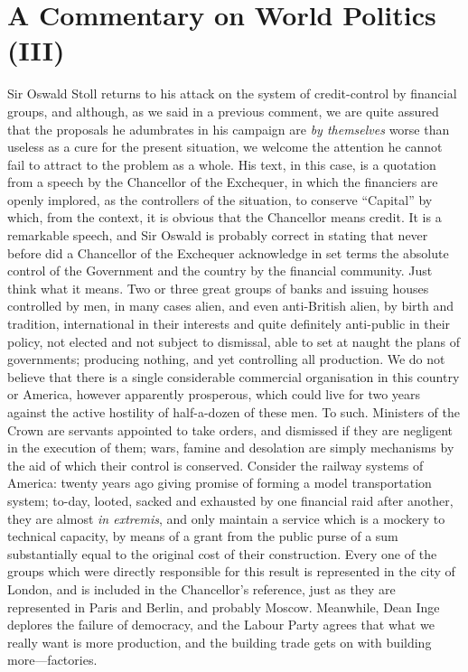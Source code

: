 \documentclass{book}
\begin{document}
\chapter{A Commentary on World Politics (III)}
\label{chapter-11}
Sir Oswald Stoll returns to his attack on the system of credit-control by financial groups, and although, as we said in a previous comment, we are quite assured that the proposals he adumbrates in his campaign are \emph{by themselves} worse than useless as a cure for the present situation, we welcome the attention he cannot fail to attract to the problem as a whole. His text, in this case, is a quotation from a speech by the Chancellor of the Exchequer, in which the financiers are openly implored, as the controllers of the situation, to conserve “Capital” by which, from the context, it is obvious that the Chancellor means credit. It is a remarkable speech, and Sir Oswald is probably correct in stating that never before did a Chancellor of the Exchequer acknowledge in set terms the absolute control of the Government and the country by the financial community. Just think what it means. Two or three great groups of banks and issuing houses controlled by men, in many cases alien, and even anti-British alien, by birth and tradition, international in their interests and quite definitely anti-public in their policy, not elected and not subject to dismissal, able to set at naught the plans of governments; producing nothing, and yet controlling all production. We do not believe that there is a single considerable commercial organisation in this country or America, however apparently prosperous, which could live for two years against the active hostility of half-a-dozen of these men. To such. Ministers of the Crown are servants appointed to take orders, and dismissed if they are negligent in the execution of them; wars, famine and desolation are simply mechanisms by the aid of which their control is conserved. Consider the railway systems of America: twenty years ago giving promise of forming a model transportation system; to-day, looted, sacked and exhausted by one financial raid after another, they are almost \emph{in extremis}, and only maintain a service which is a mockery to technical capacity, by means of a grant from the public purse of a sum substantially equal to the original cost of their construction. Every one of the groups which were directly responsible for this result is represented in the city of London, and is included in the Chancellor’s reference, just as they are represented in Paris and Berlin, and probably Moscow. Meanwhile, Dean Inge deplores the failure of democracy, and the Labour Party agrees that what we really want is more production, and the building trade gets on with building more—factories.
\end{document}
